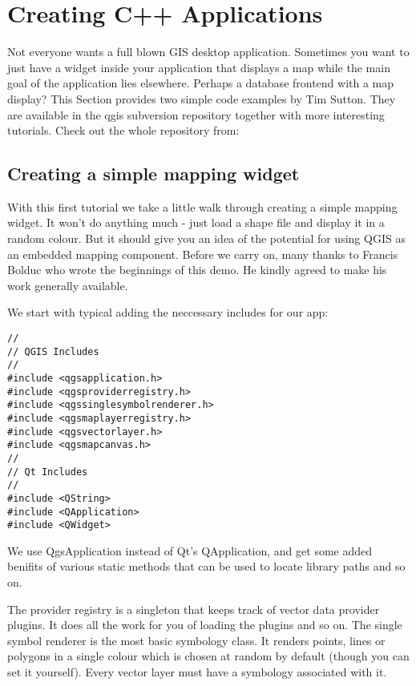 \section{Creating C++ Applications}

Not everyone wants a full blown GIS desktop application. Sometimes you want
to just have a widget inside your application that displays a map while the
main goal of the application lies elsewhere. Perhaps a database frontend with
a map display? This Section provides two simple code examples by Tim Sutton. 
They are available in the qgis subversion repository together with more
interesting tutorials. Check out the whole repository from: 

\subsection{Creating a simple mapping widget}\label{subsec:simple_widget}

With this first tutorial we take a little walk through creating a simple mapping
widget. It won't do anything much - just load a shape file and display it in
a random colour. 
But it should give you an idea of the potential for using QGIS as an embedded
mapping component. Before we carry on, many thanks to Francis Bolduc who wrote
the beginnings of this demo. He kindly agreed to make his work generally
available.

We start with typical adding the neccessary includes for our app:

\begin{verbatim}
//
// QGIS Includes
//
#include <qgsapplication.h>
#include <qgsproviderregistry.h>
#include <qgssinglesymbolrenderer.h>
#include <qgsmaplayerregistry.h>
#include <qgsvectorlayer.h>
#include <qgsmapcanvas.h>
//
// Qt Includes
//
#include <QString>
#include <QApplication>
#include <QWidget>
\end{verbatim}

We use QgsApplication instead of Qt's QApplication, and get some added
benifits of various static methods that can be used to locate library paths
and so on.

The provider registry is a singleton that keeps track of vector data provider
plugins. It does all the work for you of loading the plugins and so on. The
single symbol renderer is the most basic symbology class. It renders points,
lines or polygons in a single colour which is chosen at random by default
(though you can set it yourself). Every vector layer must have a symbology
associated with it.

